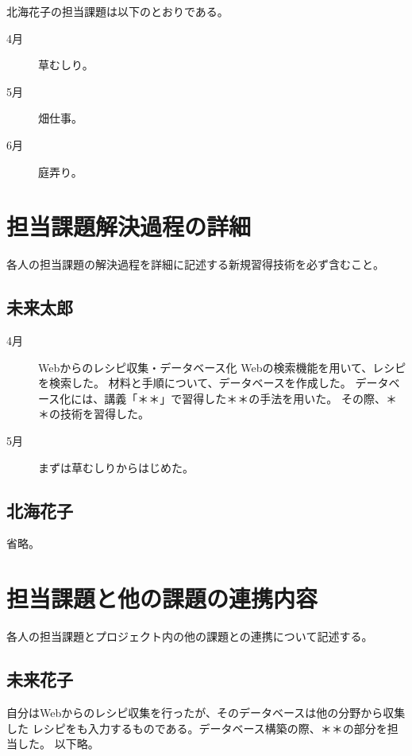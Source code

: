 \documentclass[openany,11pt,papersize]{jsbook}
\begin{document}
北海花子の担当課題は以下のとおりである。 
\begin{description}
 \item[4月] 草むしり。
 \item[5月] 畑仕事。
 \item[6月] 庭弄り。
\end{description}


\section{担当課題解決過程の詳細}
\begin{hissu}
各人の担当課題の解決過程を詳細に記述する新規習得技術を必ず含むこと。
\end{hissu}

\subsection{未来太郎}
\begin{description}
 \item[4月] Webからのレシピ収集・データベース化 
Webの検索機能を用いて、レシピを検索した。 
材料と手順について、データベースを作成した。 
データベース化には、講義「＊＊」で習得した＊＊の手法を用いた。 
その際、＊＊の技術を習得した。　　
 \item[5月]まずは草むしりからはじめた。
\end{description}



\subsection{北海花子}

省略。


\section{担当課題と他の課題の連携内容}
\begin{hissu}
各人の担当課題とプロジェクト内の他の課題との連携について記述する。
\end{hissu}

\subsection{未来花子}
自分はWebからのレシピ収集を行ったが、そのデータベースは他の分野から収集した 
レシピをも入力するものである。データベース構築の際、＊＊の部分を担当した。
以下略。
\end{document}
